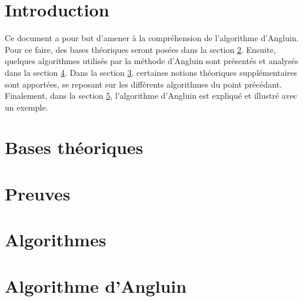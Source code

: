 

\newcommand{\student}{Benjamin André}
\newcommand{\grade}{MAB2 Sciences Informatiques}
\newcommand{\director}{Véronique Bruyère}
\renewcommand{\title}{Automates}
\renewcommand{\date}{\today}


	
	
	
	\tableofcontents
	\newpage
	
	\section{Introduction}
	Ce document a pour but d'amener à la compréhension de l'algorithme d'Angluin. Pour ce faire, des bases théoriques seront posées dans la section \ref{sec:theorie}. Ensuite, quelques algorithmes utilisés par la méthode d'Angluin sont présentés et analysés dans la section \ref{sec:algorithmes}. Dans la section \ref{sec:preuves}, certaines notions théoriques supplémentaires sont apportées, se reposant sur les différents algorithmes du point précédant. Finalement, dans la section \ref{sec:angluin}, l'algorithme d'Angluin est expliqué et illustré avec un exemple.
	
	
	\section{Bases théoriques}\label{sec:theorie}
	 
	\section{Preuves}\label{sec:preuves}
	\section{Algorithmes}\label{sec:algorithmes}
	
	\section{Algorithme d'Angluin}\label{sec:angluin}
	
	

	
	\newpage
	
	
	
